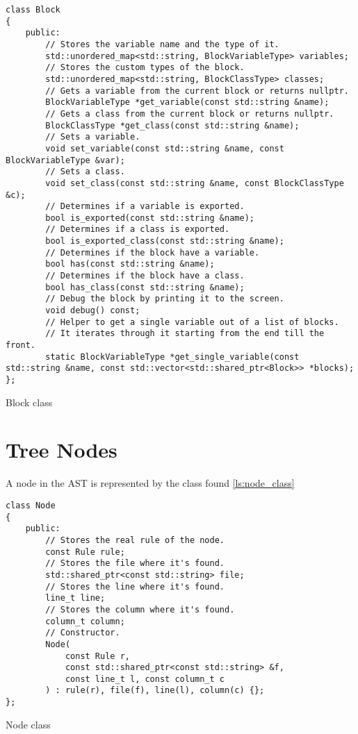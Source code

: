 \begin{listing}[H]
\begin{verbatim}
class Block
{
    public:
        // Stores the variable name and the type of it.
        std::unordered_map<std::string, BlockVariableType> variables;
        // Stores the custom types of the block.
        std::unordered_map<std::string, BlockClassType> classes;
        // Gets a variable from the current block or returns nullptr.
        BlockVariableType *get_variable(const std::string &name);
        // Gets a class from the current block or returns nullptr.
        BlockClassType *get_class(const std::string &name);
        // Sets a variable.
        void set_variable(const std::string &name, const BlockVariableType &var);
        // Sets a class.
        void set_class(const std::string &name, const BlockClassType &c);
        // Determines if a variable is exported.
        bool is_exported(const std::string &name);
        // Determines if a class is exported.
        bool is_exported_class(const std::string &name);
        // Determines if the block have a variable.
        bool has(const std::string &name);
        // Determines if the block have a class.
        bool has_class(const std::string &name);
        // Debug the block by printing it to the screen.
        void debug() const;
        // Helper to get a single variable out of a list of blocks.
        // It iterates through it starting from the end till the front.
        static BlockVariableType *get_single_variable(const std::string &name, const std::vector<std::shared_ptr<Block>> *blocks);
};
\end{verbatim}
\caption{Block class}
\label{ls:block_class}
\end{listing}

\section{Tree Nodes}

A node in the AST is represented by the class found \autoref{ls:node_class}

\begin{listing}[H]
\begin{verbatim}
class Node
{
    public:
        // Stores the real rule of the node.
        const Rule rule;
        // Stores the file where it's found.
        std::shared_ptr<const std::string> file;
        // Stores the line where it's found.
        line_t line;
        // Stores the column where it's found.
        column_t column;
        // Constructor.
        Node(
            const Rule r,
            const std::shared_ptr<const std::string> &f,
            const line_t l, const column_t c
        ) : rule(r), file(f), line(l), column(c) {};
};
\end{verbatim}
\caption{Node class}
\label{ls:node_class}
\end{listing}

